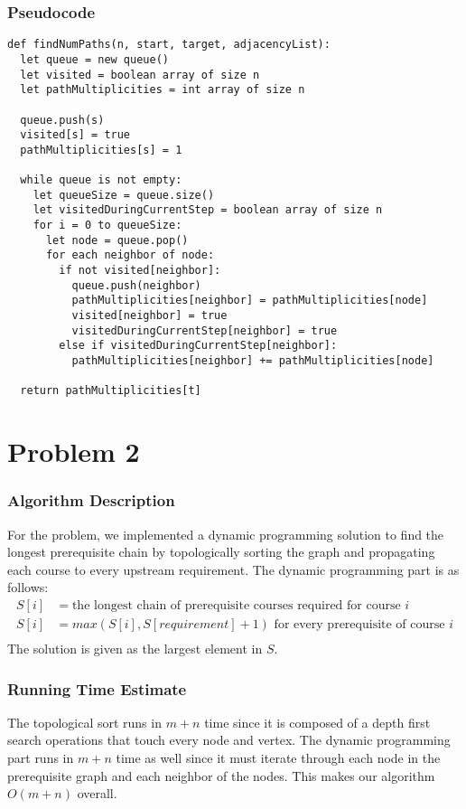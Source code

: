 \documentclass{math}
\begin{document}
\subsubsection*{Pseudocode}
\begin{lstlisting}
def findNumPaths(n, start, target, adjacencyList):
  let queue = new queue()
  let visited = boolean array of size n
  let pathMultiplicities = int array of size n

  queue.push(s)
  visited[s] = true
  pathMultiplicities[s] = 1

  while queue is not empty:
    let queueSize = queue.size()
    let visitedDuringCurrentStep = boolean array of size n
    for i = 0 to queueSize:
      let node = queue.pop()
      for each neighbor of node:
        if not visited[neighbor]:
          queue.push(neighbor)
          pathMultiplicities[neighbor] = pathMultiplicities[node]
          visited[neighbor] = true
          visitedDuringCurrentStep[neighbor] = true
        else if visitedDuringCurrentStep[neighbor]:
          pathMultiplicities[neighbor] += pathMultiplicities[node]

  return pathMultiplicities[t]
\end{lstlisting}

\section*{Problem 2}

\subsubsection*{Algorithm Description}
For the problem, we implemented a dynamic programming solution to find the
longest prerequisite chain by topologically sorting the graph and propagating
each course to every upstream requirement. The dynamic programming part is as
follows:
\begin{align*}
  S[i] &= \text{the longest chain of prerequisite courses required for course }
    i \\
  S[i] &= max(S[i], S[requirement]+1) \text{ for every prerequisite of course }
    i \\
\end{align*}
The solution is given as the largest element in \( S \).

\subsubsection*{Running Time Estimate}
The topological sort runs in \( m+n \) time since it is composed of a depth
first search operations that touch every node and vertex. The dynamic
programming part runs in \( m+n \) time as well since it must iterate
through each node in the prerequisite graph and each neighbor of the nodes.
This makes our algorithm \( O(m+n) \) overall.
\end{document}
